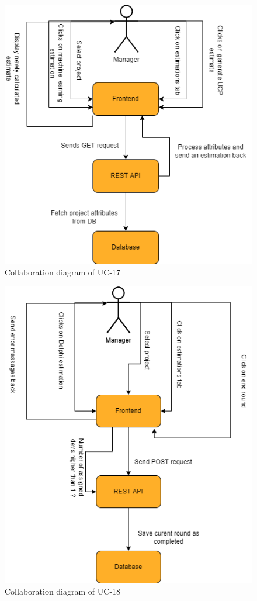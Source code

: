 \begin{figure}[H]
    \centering
    \includegraphics[scale=0.5]{./diagrams/collaboration/cd-17.png}
    \caption{Collaboration diagram of UC-17}
    \label{fig:cd-17}
    
\end{figure}


\begin{figure}[H]
    \centering
    \includegraphics[scale=0.5]{./diagrams/collaboration/cd-18.png}
    \caption{Collaboration diagram of UC-18}
    \label{fig:cd-18}
    
\end{figure}


